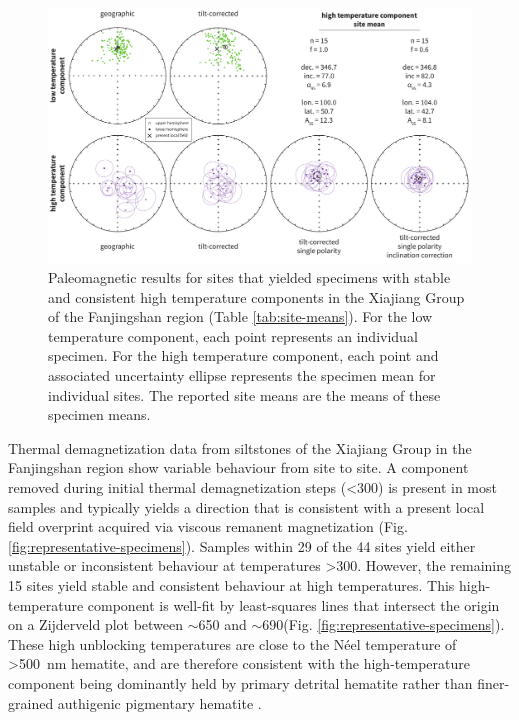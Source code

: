 \begin{figure}[h!]
    \centering
    \includegraphics[width=\textwidth]{figures/Xiajiang/site-means.pdf}
    \caption[Paleomagnetic results for the Xiajiang Group of the Fanjingshan region.]{Paleomagnetic results for sites that yielded specimens with stable and consistent high temperature components in the Xiajiang Group of the Fanjingshan region (Table \ref{tab:site-means}). For the low temperature component, each point represents an individual specimen. For the high temperature component, each point and associated uncertainty ellipse represents the specimen mean for individual sites. The reported site means are the means of these specimen means.}
    \label{fig:site-means}
\end{figure}

Thermal demagnetization data from siltstones of the Xiajiang Group in the Fanjingshan region show variable behaviour from site to site. A component removed during initial thermal demagnetization steps (\textless300\degreesC) is present in most samples and typically yields a direction that is consistent with a present local field overprint acquired via viscous remanent magnetization (Fig. \ref{fig:representative-specimens}). Samples within 29 of the 44 sites yield either unstable or inconsistent behaviour at temperatures \textgreater300\degreesC. However, the remaining 15 sites yield stable and consistent behaviour at high temperatures. This high-temperature component is well-fit by least-squares lines that intersect the origin on a Zijderveld plot between $\sim$650 and $\sim$690\degreesC (Fig. \ref{fig:representative-specimens}). These high unblocking temperatures are close to the N\'eel temperature of \textgreater500~nm hematite, and are therefore consistent with the high-temperature component being dominantly held by primary detrital hematite rather than finer-grained authigenic pigmentary hematite \citep{Dunlop2001a, Jiang2015a, Swanson-Hysell2019b}.

